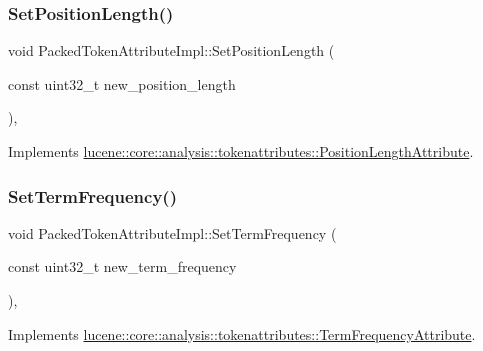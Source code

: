 \subsubsection{\texorpdfstring{Set\+Position\+Length()}{SetPositionLength()}}
{\footnotesize\ttfamily void Packed\+Token\+Attribute\+Impl\+::\+Set\+Position\+Length (\begin{DoxyParamCaption}\item[{const uint32\+\_\+t}]{new\+\_\+position\+\_\+length }\end{DoxyParamCaption})\hspace{0.3cm}{\ttfamily [override]}, {\ttfamily [virtual]}}



Implements \mbox{\hyperlink{classlucene_1_1core_1_1analysis_1_1tokenattributes_1_1PositionLengthAttribute_a514415965bae0dd392cbb8d65ea4d808}{lucene\+::core\+::analysis\+::tokenattributes\+::\+Position\+Length\+Attribute}}.

\mbox{\label{classlucene_1_1core_1_1analysis_1_1tokenattributes_1_1PackedTokenAttributeImpl_a4d9dfc6cc7c825d42789245b8ca003c4}} 
\subsubsection{\texorpdfstring{Set\+Term\+Frequency()}{SetTermFrequency()}}
{\footnotesize\ttfamily void Packed\+Token\+Attribute\+Impl\+::\+Set\+Term\+Frequency (\begin{DoxyParamCaption}\item[{const uint32\+\_\+t}]{new\+\_\+term\+\_\+frequency }\end{DoxyParamCaption})\hspace{0.3cm}{\ttfamily [override]}, {\ttfamily [virtual]}}



Implements \mbox{\hyperlink{classlucene_1_1core_1_1analysis_1_1tokenattributes_1_1TermFrequencyAttribute_aeb8ef8cc3f3ab6c8678b491ac3e1b682}{lucene\+::core\+::analysis\+::tokenattributes\+::\+Term\+Frequency\+Attribute}}.


